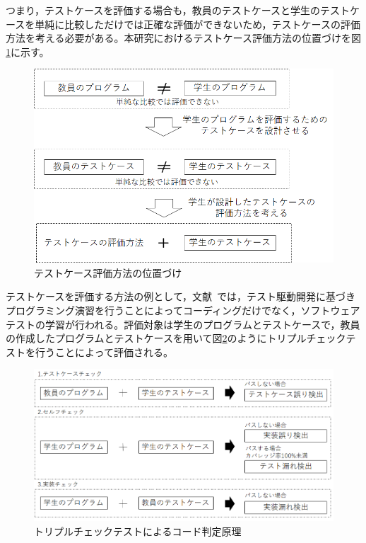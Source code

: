 \documentclass{tpu-sotu}
\begin{document}
つまり，テストケースを評価する場合も，教員のテストケースと学生のテストケースを単純に比較しただけでは正確な評価ができないため，テストケースの評価方法を考える必要がある。本研究におけるテストケース評価方法の位置づけを図\ref{a1}に示す。
\begin{figure}[h]
  \centering
  \includegraphics[width=130mm]{テストケース評価方法の位置づけ.png}
  \caption{テストケース評価方法の位置づけ}
  \label{a1}
\end{figure}
\newpage
テストケースを評価する方法の例として，文献~\cite{a0}では，テスト駆動開発に基づきプログラミング演習を行うことによってコーディングだけでなく，ソフトウェアテストの学習が行われる。評価対象は学生のプログラムとテストケースで，教員の作成したプログラムとテストケースを用いて図\ref{a2}のようにトリプルチェックテストを行うことによって評価される。
\newpage
\begin{figure}[h]
  \centering
  \includegraphics[width=130mm]{トリプルチェック.png}
  \caption{トリプルチェックテストによるコード判定原理}
  \label{a2}
\end{figure}
\end{document}
